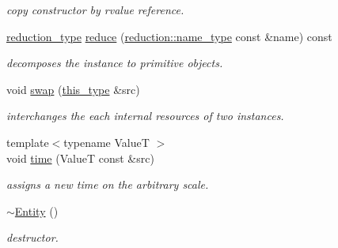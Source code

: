 \begin{DoxyCompactItemize}
\begin{DoxyCompactList}\small\item\em copy constructor by rvalue reference. \end{DoxyCompactList}\item 
\hypertarget{classhryky_1_1http_1_1header_1_1date_1_1_entity_af497be79643943d6a434302f52b65e37}{\hyperlink{namespacehryky_a343a9a4c36a586be5c2693156200eadc}{reduction\-\_\-type} \hyperlink{classhryky_1_1http_1_1header_1_1date_1_1_entity_af497be79643943d6a434302f52b65e37}{reduce} (\hyperlink{namespacehryky_1_1reduction_ac686c30a4c8d196bbd0f05629a6b921f}{reduction\-::name\-\_\-type} const \&name) const }\label{classhryky_1_1http_1_1header_1_1date_1_1_entity_af497be79643943d6a434302f52b65e37}

\begin{DoxyCompactList}\small\item\em decomposes the instance to primitive objects. \end{DoxyCompactList}\item 
\hypertarget{classhryky_1_1http_1_1header_1_1date_1_1_entity_a69a4c00a57958e27e21b382057b0cdae}{void \hyperlink{classhryky_1_1http_1_1header_1_1date_1_1_entity_a69a4c00a57958e27e21b382057b0cdae}{swap} (\hyperlink{classhryky_1_1http_1_1header_1_1date_1_1_entity_added79307f2e97ca6c8e687bc56c7b5b}{this\-\_\-type} \&src)}\label{classhryky_1_1http_1_1header_1_1date_1_1_entity_a69a4c00a57958e27e21b382057b0cdae}

\begin{DoxyCompactList}\small\item\em interchanges the each internal resources of two instances. \end{DoxyCompactList}\item 
\hypertarget{classhryky_1_1http_1_1header_1_1date_1_1_entity_abbbedfa21934cd6f73cdcff37e53a1f4}{{\footnotesize template$<$typename Value\-T $>$ }\\void \hyperlink{classhryky_1_1http_1_1header_1_1date_1_1_entity_abbbedfa21934cd6f73cdcff37e53a1f4}{time} (Value\-T const \&src)}\label{classhryky_1_1http_1_1header_1_1date_1_1_entity_abbbedfa21934cd6f73cdcff37e53a1f4}

\begin{DoxyCompactList}\small\item\em assigns a new time on the arbitrary scale. \end{DoxyCompactList}\item 
\hypertarget{classhryky_1_1http_1_1header_1_1date_1_1_entity_a92527e7f7f2b51e6d1e219905f6aac2f}{\hyperlink{classhryky_1_1http_1_1header_1_1date_1_1_entity_a92527e7f7f2b51e6d1e219905f6aac2f}{$\sim$\-Entity} ()}\label{classhryky_1_1http_1_1header_1_1date_1_1_entity_a92527e7f7f2b51e6d1e219905f6aac2f}

\begin{DoxyCompactList}\small\item\em destructor. \end{DoxyCompactList}\end{DoxyCompactItemize}
